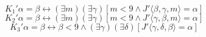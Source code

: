 $$K_1' \alpha = \beta \leftrightarrow (\exists m)(\exists \gamma)[m < 9 \land J' \langle \beta, \gamma, m \rangle = \alpha]$$
$$K_2' \alpha = \beta \leftrightarrow (\exists m)(\exists \gamma)[m < 9 \land J' \langle \gamma, \beta, m \rangle = \alpha]$$
$$K_3' \alpha = \beta \leftrightarrow \beta < 9 \land (\exists \gamma)(\exists \delta)[J' \langle \gamma, \delta, \beta \rangle = \alpha]$$
